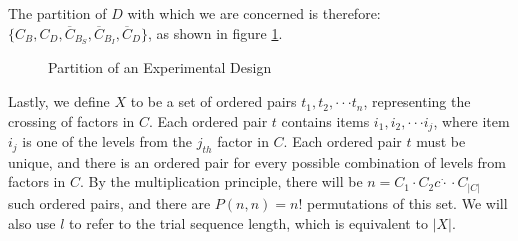 The partition of $D$ with which we are concerned is therefore: $\{C_B, C_D, \overline{C}_{B_S}, \overline{C}_{B_I}, \overline{C}_D\}$, as shown in figure \ref{fig:partition}.


\begin{figure}[t]
\centering
{}
\caption{Partition of an Experimental Design}
\label{fig:partition}
\end{figure}

Lastly, we define $X$ to be a set of ordered pairs $t_1, t_2, \cdot\cdot\cdot t_n$, representing the crossing of factors in $C$. Each ordered pair $t$ contains items $i_1, i_2, \cdot\cdot\cdot i_j$, where item $i_j$ is one of the levels from the $j_{th}$ factor in $C$. Each ordered pair $t$ must be unique, and there is an ordered pair for every possible combination of levels from factors in $C$. By the multiplication principle, there will be $n = C_1 \cdot C_2 c\dot\cdot\cdot C_{|C|}$ such ordered pairs, and there are $P(n, n) = n!$ permutations of this set. We will also use $l$ to refer to the trial sequence length, which is equivalent to $|X|$.


